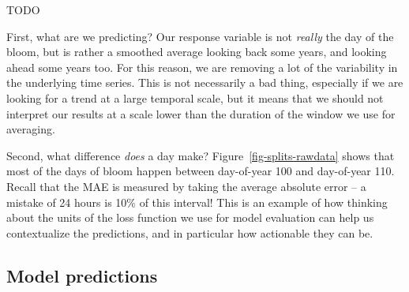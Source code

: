 \documentclass[
  letterpaper,
]{scrbook}
\begin{document}
\begin{table}

\caption{\label{tbl-splits-performance-summary}TODO}


\end{table}%

First, what are we predicting? Our response variable is not
\emph{really} the day of the bloom, but is rather a smoothed average
looking back some years, and looking ahead some years too. For this
reason, we are removing a lot of the variability in the underlying time
series. This is not necessarily a bad thing, especially if we are
looking for a trend at a large temporal scale, but it means that we
should not interpret our results at a scale lower than the duration of
the window we use for averaging.

Second, what difference \emph{does} a day make?
Figure~\ref{fig-splits-rawdata} shows that most of the days of bloom
happen between day-of-year 100 and day-of-year 110. Recall that the MAE
is measured by taking the average absolute error -- a mistake of 24
hours is 10\% of this interval! This is an example of how thinking about
the units of the loss function we use for model evaluation can help us
contextualize the predictions, and in particular how actionable they can
be.

\subsection{Model predictions}\label{model-predictions}
\end{document}
